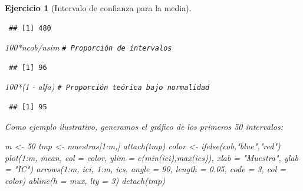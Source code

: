 \documentclass[
  10pt,
]{book}
\newenvironment{Shaded}{\begin{snugshade}}{\end{snugshade}}
\newcommand{\AttributeTok}[1]{\textcolor[rgb]{0.77,0.63,0.00}{#1}}
\newcommand{\CommentTok}[1]{\textcolor[rgb]{0.56,0.35,0.01}{\textit{#1}}}
\newcommand{\DecValTok}[1]{\textcolor[rgb]{0.00,0.00,0.81}{#1}}
\newcommand{\FloatTok}[1]{\textcolor[rgb]{0.00,0.00,0.81}{#1}}
\newcommand{\FunctionTok}[1]{\textcolor[rgb]{0.00,0.00,0.00}{#1}}
\newcommand{\NormalTok}[1]{#1}
\newcommand{\OtherTok}[1]{\textcolor[rgb]{0.56,0.35,0.01}{#1}}
\newcommand{\SpecialCharTok}[1]{\textcolor[rgb]{0.00,0.00,0.00}{#1}}
\newcommand{\StringTok}[1]{\textcolor[rgb]{0.31,0.60,0.02}{#1}}
\theoremstyle{break}
\newtheorem{exercise}{Ejercicio}[chapter]
\theoremstyle{nonumberplain}
\renewcommand{\CommentTok}[1]{\textcolor[rgb]{0.41,0.41,0.41}{\texttt{#1}}}
\begin{document}
\begin{exercise}[Intervalo de confianza para la media]
\begin{enumerate}
\begin{verbatim}
 ## [1] 480
\end{verbatim}

\begin{Shaded}
\begin{Highlighting}[]
\DecValTok{100}\SpecialCharTok{*}\NormalTok{ncob}\SpecialCharTok{/}\NormalTok{nsim     }\CommentTok{\# Proporción de intervalos}
\end{Highlighting}
\end{Shaded}

\begin{verbatim}
 ## [1] 96
\end{verbatim}

\begin{Shaded}
\begin{Highlighting}[]
\DecValTok{100}\SpecialCharTok{*}\NormalTok{(}\DecValTok{1} \SpecialCharTok{{-}}\NormalTok{ alfa)    }\CommentTok{\# Proporción teórica bajo normalidad}
\end{Highlighting}
\end{Shaded}

\begin{verbatim}
 ## [1] 95
\end{verbatim}

  Como ejemplo ilustrativo, generamos el gráfico de los primeros 50 intervalos:

\begin{Shaded}
\begin{Highlighting}[]
\NormalTok{m }\OtherTok{\textless{}{-}} \DecValTok{50}
\NormalTok{tmp }\OtherTok{\textless{}{-}}\NormalTok{ muestras[}\DecValTok{1}\SpecialCharTok{:}\NormalTok{m,]}
\FunctionTok{attach}\NormalTok{(tmp)}
\NormalTok{color }\OtherTok{\textless{}{-}} \FunctionTok{ifelse}\NormalTok{(cob,}\StringTok{"blue"}\NormalTok{,}\StringTok{"red"}\NormalTok{)}
\FunctionTok{plot}\NormalTok{(}\DecValTok{1}\SpecialCharTok{:}\NormalTok{m, mean, }\AttributeTok{col =}\NormalTok{ color, }\AttributeTok{ylim =} \FunctionTok{c}\NormalTok{(}\FunctionTok{min}\NormalTok{(ici),}\FunctionTok{max}\NormalTok{(ics)), }
     \AttributeTok{xlab =} \StringTok{"Muestra"}\NormalTok{, }\AttributeTok{ylab =} \StringTok{"IC"}\NormalTok{)}
\FunctionTok{arrows}\NormalTok{(}\DecValTok{1}\SpecialCharTok{:}\NormalTok{m, ici, }\DecValTok{1}\SpecialCharTok{:}\NormalTok{m, ics, }\AttributeTok{angle =} \DecValTok{90}\NormalTok{, }\AttributeTok{length =} \FloatTok{0.05}\NormalTok{, }\AttributeTok{code =} \DecValTok{3}\NormalTok{, }\AttributeTok{col =}\NormalTok{ color)}
\FunctionTok{abline}\NormalTok{(}\AttributeTok{h =}\NormalTok{ mux, }\AttributeTok{lty =} \DecValTok{3}\NormalTok{)}
\FunctionTok{detach}\NormalTok{(tmp)}
\end{Highlighting}
\end{Shaded}


\end{enumerate}
\end{exercise}
\end{document}
